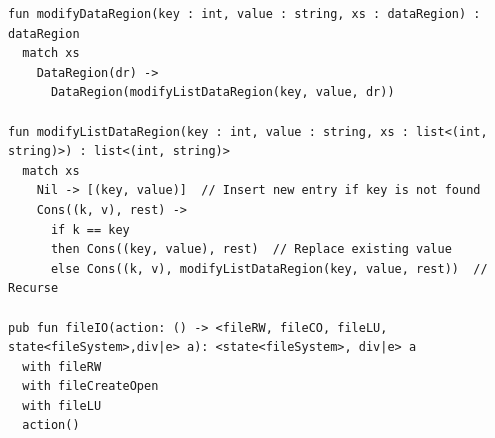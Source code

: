 \documentclass[logo,bsc,singlespacing,parskip]{infthesis}
\begin{document}
\begin{lstlisting}
fun modifyDataRegion(key : int, value : string, xs : dataRegion) : dataRegion
  match xs
    DataRegion(dr) ->
      DataRegion(modifyListDataRegion(key, value, dr))

fun modifyListDataRegion(key : int, value : string, xs : list<(int, string)>) : list<(int, string)>
  match xs
    Nil -> [(key, value)]  // Insert new entry if key is not found
    Cons((k, v), rest) ->
      if k == key
      then Cons((key, value), rest)  // Replace existing value
      else Cons((k, v), modifyListDataRegion(key, value, rest))  // Recurse

pub fun fileIO(action: () -> <fileRW, fileCO, fileLU, state<fileSystem>,div|e> a): <state<fileSystem>, div|e> a
  with fileRW
  with fileCreateOpen
  with fileLU
  action()





\end{lstlisting}
\end{document}
